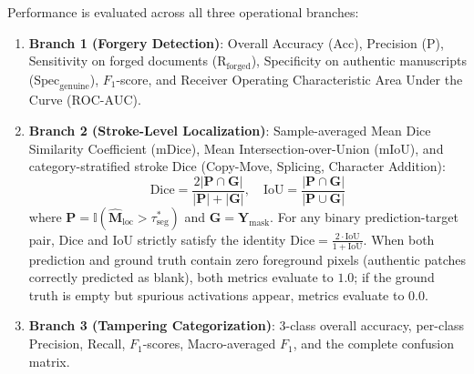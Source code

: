 \documentclass[pdflatex,sn-mathphys-num,iicol]{sn-jnl}
\begin{document}
\noindent
Performance is evaluated across all three operational branches:
\begin{enumerate}[1.]
    \item \textbf{Branch 1 (Forgery Detection)}: Overall Accuracy ($\text{Acc}$), Precision ($\text{P}$), Sensitivity on forged documents ($\text{R}_{\text{forged}}$), Specificity on authentic manuscripts ($\text{Spec}_{\text{genuine}}$), $F_1$-score, and Receiver Operating Characteristic Area Under the Curve ($\text{ROC-AUC}$).
    \item \textbf{Branch 2 (Stroke-Level Localization)}: Sample-averaged Mean Dice Similarity Coefficient ($\text{mDice}$), Mean Intersection-over-Union ($\text{mIoU}$), and category-stratified stroke Dice (Copy-Move, Splicing, Character Addition):
    \begin{equation}
    \text{Dice} = \frac{2 |\mathbf{P} \cap \mathbf{G}|}{|\mathbf{P}| + |\mathbf{G}|}, \quad \text{IoU} = \frac{|\mathbf{P} \cap \mathbf{G}|}{|\mathbf{P} \cup \mathbf{G}|}\label{eq_metrics_seg}
    \end{equation}
    where $\mathbf{P} = \mathbb{I}(\hat{\mathbf{M}}_{\text{loc}} > \tau_{\text{seg}}^*)$ and $\mathbf{G} = \mathbf{Y}_{\text{mask}}$. For any binary prediction-target pair, Dice and IoU strictly satisfy the identity $\text{Dice} = \frac{2 \cdot \text{IoU}}{1 + \text{IoU}}$. When both prediction and ground truth contain zero foreground pixels (authentic patches correctly predicted as blank), both metrics evaluate to $1.0$; if the ground truth is empty but spurious activations appear, metrics evaluate to $0.0$.
    \item \textbf{Branch 3 (Tampering Categorization)}: 3-class overall accuracy, per-class Precision, Recall, $F_1$-scores, Macro-averaged $F_1$, and the complete confusion matrix.
\end{enumerate}
\end{document}
